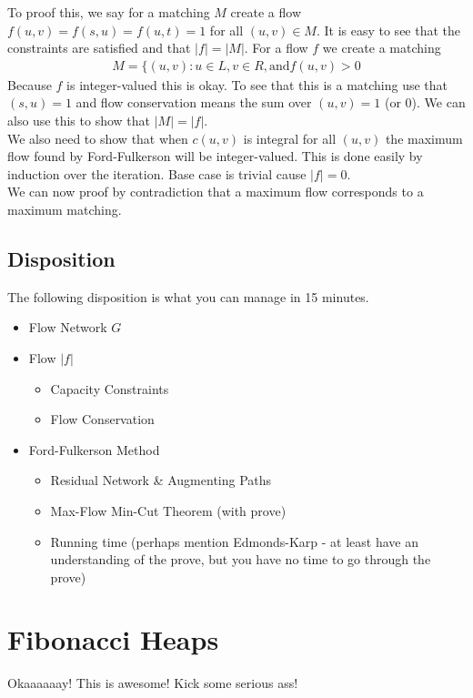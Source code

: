 \documentclass[12pt]{article}
\begin{document}
To proof this, we say for a matching $M$ create a flow $f(u, v) = f(s, u) = f(u, t) = 1$ for all $(u, v) \in M$. It is easy to see that the constraints are satisfied and that $|f| = |M|$. For a flow $f$ we create a matching
\begin{align*}
	M = \{(u, v) : u \in L, v \in R, \text{and} f(u, v) > 0 
\end{align*}
Because $f$ is integer-valued this is okay. To see that this is a matching use that $(s, u) = 1$ and flow conservation means the sum over $(u, v) = 1$ (or $0$). We can also use this to show that $|M| = |f|$. \\

We also need to show that when $c(u, v)$ is integral for all $(u, v)$ the maximum flow found by Ford-Fulkerson will be integer-valued. This is done easily by induction over the iteration. Base case is trivial cause $|f| = 0$.\\

We can now proof by contradiction that a maximum flow corresponds to a maximum matching.

\subsection{Disposition}
The following disposition is what you can manage in 15 minutes. 
\begin{itemize}
	\item Flow Network $G$
	\item Flow $|f|$
		\begin{itemize}
			\item Capacity Constraints
			\item Flow Conservation
		\end{itemize}
	\item Ford-Fulkerson Method
		\begin{itemize}
			\item Residual Network \& Augmenting Paths
			\item Max-Flow Min-Cut Theorem (with prove)
			\item Running time (perhaps mention Edmonds-Karp - at least have an understanding of the prove, but you have no time to go through the prove)
		\end{itemize}
\end{itemize}

\newpage

\section{Fibonacci Heaps}
Okaaaaaay! This is awesome! Kick some serious ass!
\end{document}
